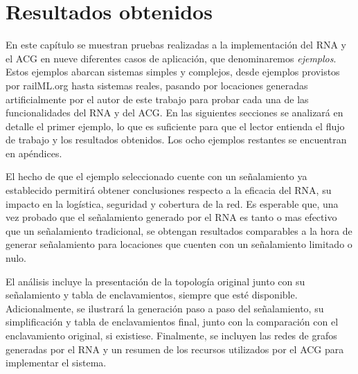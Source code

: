 \chapter{Resultados obtenidos}
	\label{sec:resultados}

	En este capítulo se muestran pruebas realizadas a la implementación del RNA y el ACG en nueve diferentes casos de aplicación, que denominaremos \textit{ejemplos}. Estos ejemplos abarcan sistemas simples y complejos, desde ejemplos provistos por railML.org hasta sistemas reales, pasando por locaciones generadas artificialmente por el autor de este trabajo para probar cada una de las funcionalidades del RNA y del ACG. En las siguientes secciones se analizará en detalle el primer ejemplo, lo que es suficiente para que el lector entienda el flujo de trabajo y los resultados obtenidos. Los ocho ejemplos restantes se encuentran en apéndices.
	
	El hecho de que el ejemplo seleccionado cuente con un señalamiento ya establecido permitirá obtener conclusiones respecto a la eficacia del RNA, su impacto en la logística, seguridad y cobertura de la red. Es esperable que, una vez probado que el señalamiento generado por el RNA es tanto o mas efectivo que un señalamiento tradicional, se obtengan resultados comparables a la hora de generar señalamiento para locaciones que cuenten con un señalamiento limitado o nulo.	
	
	El análisis incluye la presentación de la topología original junto con su señalamiento y tabla de enclavamientos, siempre que esté disponible. Adicionalmente, se ilustrará la generación paso a paso del señalamiento, su simplificación y tabla de enclavamientos final, junto con la comparación con el enclavamiento original, si existiese. Finalmente, se incluyen las redes de grafos generadas por el RNA y un resumen de los recursos utilizados por el ACG para implementar el sistema.
	
	
	
	
